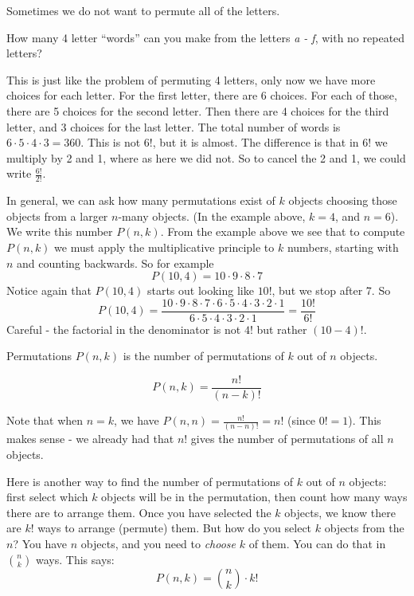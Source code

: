 \documentclass[12pt]{article}
\begin{document}
Sometimes we do not want to permute all of the letters. 

\begin{example}
  How many 4 letter ``words'' can you make from the letters \textit{a - f}, with no repeated letters?
  \begin{solution}
    This is just like the problem of permuting 4 letters, only now we have more choices for each letter.  For the first letter, there are 6 choices.  For each of those, there are 5 choices for the second letter.  Then there are 4 choices for the third letter, and 3 choices for the last letter.  The total number of words is $6\cdot 5\cdot 4 \cdot 3 = 360$.  This is not $6!$, but it is almost.  The difference is that in $6!$ we multiply by 2 and 1, where as here we did not.  So to cancel the 2 and 1, we could write $\frac{6!}{2!}$.
  \end{solution}
\end{example}

In general, we can ask how many permutations exist of $k$ objects choosing those objects from a larger $n$-many objects.  (In the example above, $k = 4$, and $n = 6$).  We write this number $P(n,k)$.  From the example above we see that to compute $P(n,k)$ we must apply the multiplicative principle to $k$ numbers, starting with $n$ and counting backwards.  So for example
\[P(10, 4) = 10\cdot 9 \cdot 8 \cdot 7\]
Notice again that $P(10,4)$ starts out looking like $10!$, but we stop after 7.  So
\[P(10,4) = \frac{10\cdot 9 \cdot 8 \cdot 7 \cdot 6 \cdot 5 \cdot 4 \cdot 3 \cdot 2 \cdot 1}{6 \cdot 5 \cdot 4 \cdot 3 \cdot 2 \cdot 1} = \frac{10!}{6!}\]
Careful - the factorial in the denominator is not $4!$ but rather $(10-4)!$.  

\begin{defbox}{Permutations}
 $P(n,k)$ is the number of permutations of $k$ out of $n$ objects.
 
 \[P(n,k) = \frac{n!}{(n-k)!}\]
\end{defbox}

Note that when $n = k$, we have $P(n,n) = \frac{n!}{(n-n)!} = n!$ (since $0! = 1$).  This makes sense - we already had that $n!$ gives the number of permutations of all $n$ objects.

Here is another way to find the number of permutations of $k$ out of $n$ objects: first select which $k$ objects will be in the permutation, then count how many ways there are to arrange them.  Once you have selected the $k$ objects, we know there are $k!$ ways to arrange (permute) them.  But how do you select $k$ objects from the $n$?  You have $n$ objects, and you need to {\em choose} $k$ of them.  You can do that in ${n \choose k}$ ways.  This says:
\[P(n,k) = {n \choose k}\cdot k!\]
\end{document}
